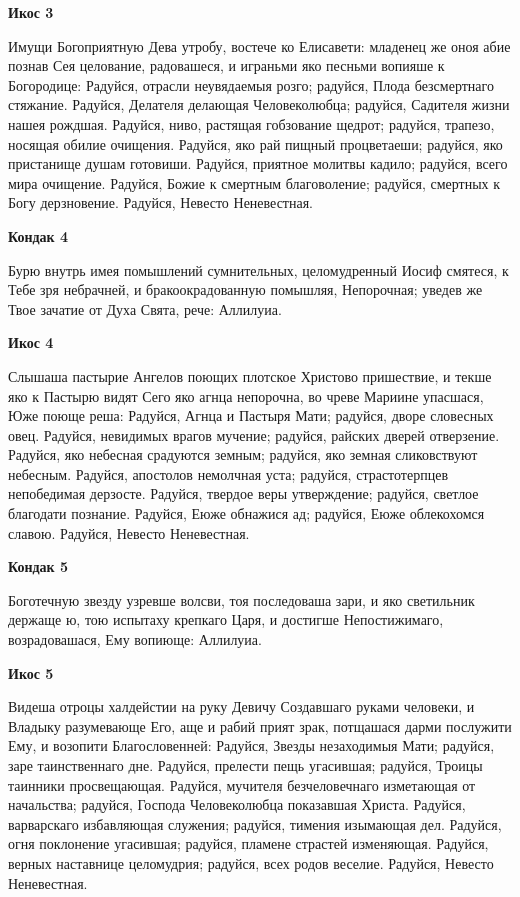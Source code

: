 \bfseries Икос 3\normalfont{}


Имущи Богоприятную Дева утробу, востече ко Елисавети: младенец же оноя абие познав Сея целование, радовашеся, и играньми яко песньми вопияше к Богородице: Радуйся, отрасли неувядаемыя розго; радуйся, Плода безсмертнаго стяжание. Радуйся, Делателя делающая Человеколюбца; радуйся, Садителя жизни нашея рождшая. Радуйся, ниво, растящая гобзование щедрот; радуйся, трапезо, носящая обилие очищения. Радуйся, яко рай пищный процветаеши; радуйся, яко пристанище душам готовиши. Радуйся, приятное молитвы кадило; радуйся, всего мира очищение. Радуйся, Божие к смертным благоволение; радуйся, смертных к Богу дерзновение. Радуйся, Невесто Неневестная.


\bfseries Кондак 4\normalfont{}


Бурю внутрь имея помышлений сумнительных, целомудренный Иосиф смятеся, к Тебе зря небрачней, и бракоокрадованную помышляя, Непорочная; уведев же Твое зачатие от Духа Свята, рече: Аллилуиа.


\bfseries Икос 4\normalfont{}


Слышаша пастырие Ангелов поющих плотское Христово пришествие, и текше яко к Пастырю видят Сего яко агнца непорочна, во чреве Мариине упасшася, Юже поюще реша: Радуйся, Агнца и Пастыря Мати; радуйся, дворе словесных овец. Радуйся, невидимых врагов мучение; радуйся, райских дверей отверзение. Радуйся, яко небесная срадуются земным; радуйся, яко земная сликовствуют небесным. Радуйся, апостолов немолчная уста; радуйся, страстотерпцев непобедимая дерзосте. Радуйся, твердое веры утверждение; радуйся, светлое благодати познание. Радуйся, Еюже обнажися ад; радуйся, Еюже облекохомся славою. Радуйся, Невесто Неневестная.


\bfseries Кондак 5\normalfont{}


Боготечную звезду узревше волсви, тоя последоваша зари, и яко светильник держаще ю, тою испытаху крепкаго Царя, и достигше Непостижимаго, возрадовашася, Ему вопиюще: Аллилуиа.


\bfseries Икос 5\normalfont{}


Видеша отроцы халдейстии на руку Девичу Создавшаго руками человеки, и Владыку разумевающе Его, аще и рабий прият зрак, потщашася дарми послужити Ему, и возопити Благословенней: Радуйся, Звезды незаходимыя Мати; радуйся, заре таинственнаго дне. Радуйся, прелести пещь угасившая; радуйся, Троицы таинники просвещающая. Радуйся, мучителя безчеловечнаго изметающая от начальства; радуйся, Господа Человеколюбца показавшая Христа. Радуйся, варварскаго избавляющая служения; радуйся, тимения изымающая дел. Радуйся, огня поклонение угасившая; радуйся, пламене страстей изменяющая. Радуйся, верных наставнице целомудрия; радуйся, всех родов веселие. Радуйся, Невесто Неневестная.



